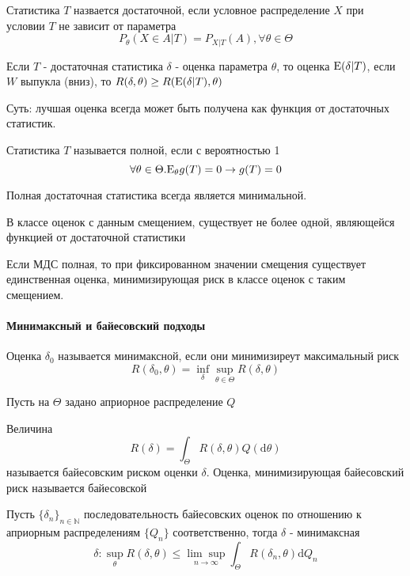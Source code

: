 \documentclass[main.tex]{subfiles}
\begin{document}
\begin{definition}
	Статистика $T$ назвается достаточной, если условное распределение $X$ при условии $T$ не зависит от параметра
	$$P_\theta(X\in A|T) = P_{X|T}(A),\forall \theta \in \Theta $$
\end{definition}

\begin{theorem}
	Если $T$ - достаточная статистика $\delta$ - оценка параметра $\theta$, то оценка $\mathrm{E}(\delta|T)$, если $W$ выпукла (вниз), то $R(\delta,\theta)\geq R(\mathrm{E}(\delta|T),\theta)$
\end{theorem}
Суть: лучшая оценка всегда может быть получена как функция от достаточных статистик.

\begin{definition}
	Статистика $T$ называется полной, если с вероятностью 1 $$\forall\theta\in\Theta.\mathrm{E}_\theta g(T)=0 \rightarrow g(T)=0$$
\end{definition}
Полная достаточная статистика всегда является минимальной.
\begin{theorem}
	В классе оценок с данным смещением, существует не более одной, являющейся функцией от достаточной статистики
\end{theorem}
Если МДС полная, то при фиксированном значении смещения существует единственная оценка, минимизирующая риск в классе оценок с таким смещением.

\paragraph{Минимаксный и байесовский подходы}
\begin{definition}
	Оценка $\delta_0$ называется минимаксной, если они минимизиреут максимальный риск $$R(\delta_0,\theta)=\inf_\delta \sup_{\theta\in\Theta} R(\delta,\theta)$$
\end{definition}

Пусть на $\Theta$ задано априорное распределение $Q$
\begin{definition}
	Величина $$R(\delta)=\int_\Theta R(\delta,\theta)Q(\mathrm{d}\theta) $$ называется байесовским риском оценки $\delta$. Оценка, минимизирующая байесовский риск называется байесовской
\end{definition}

\begin{theorem}[Лемана]
	Пусть $\{\delta_n\}_{n\in\mathbb{N}}$ последовательность байесовских оценок по отношению к априорным распределениям $\{Q_n\}$ соответственно, тогда $\delta$ - минимаксная
	$$\delta : \sup_\theta R(\delta,\theta) \leq \underset{n\rightarrow\infty}{\lim\sup}\int_\Theta R(\delta_n,\theta)\mathrm{d}Q_n$$
\end{theorem}
\end{document}

